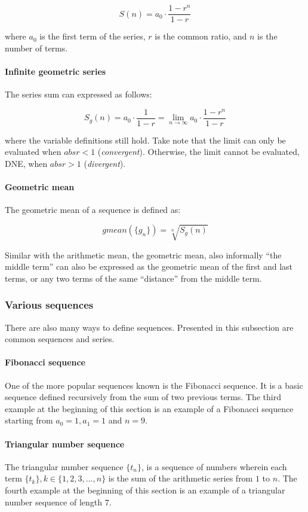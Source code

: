 \[
  S(n) = a_0 \cdot \dfrac{1-r^n}{1-r}  
\]

where $a_0$ is the first term of the series, $r$ is the common ratio, and $n$ is the number of terms.

\paragraph{Infinite geometric series}
The series sum can expressed as follows:

\[
  S_g(n) = a_0 \cdot \dfrac{1}{1-r} = \lim_{n\to \infty} a_0\cdot\dfrac{1-r^n}{1-r}
\]

where the variable definitions still hold.
Take note that the limit can only be evaluated when $abs{r} < 1$ (\emph{convergent}).
Otherwise, the limit cannot be evaluated, DNE, when $abs{r} > 1$ (\emph{divergent}).

\paragraph{Geometric mean}
The geometric mean of a sequence is defined as:

\[
  gmean(\{ g_n\}) = \sqrt[n]{S_g(n)}
\]

Similar with the arithmetic mean, the geometric mean, also informally ``the middle term'' can also be expressed as the geometric mean of the first and last terms, or any two terms of the same ``distance'' from the middle term.

\subsubsection{Various sequences}
There are also many ways to define sequences.
Presented in this subsection are common sequences and series.

\paragraph{Fibonacci sequence}
One of the more popular sequences known is the Fibonacci sequence.
It is a basic sequence defined recursively from the sum of two previous terms.
The third example at the beginning of this section is an example of a Fibonacci sequence starting from $a_0 = 1, a_1 = 1$ and $n = 9$.

\paragraph{Triangular number sequence}
The triangular number sequence $\{ t_n\}$, is a sequence of numbers wherein each term $\{t_k\}, k \in \{ 1, 2, 3, \ldots, n\}$ is the sum of the arithmetic series from $1$ to $n$.
The fourth example at the beginning of this section is an example of a triangular number sequence of length $7$.

